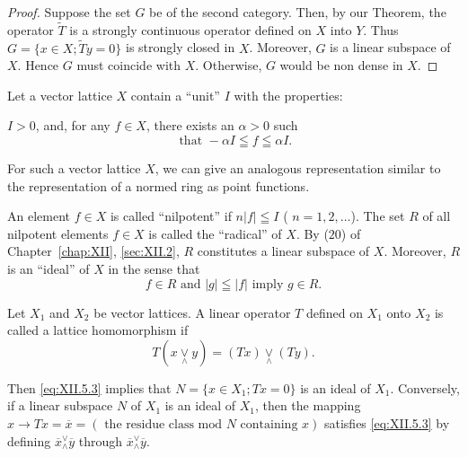 \begin{proof}
 Suppose the set $G$ be of the second category. Then, by our Theorem, the operator $\tilde{T}$ is a strongly continuous operator defined on $X$ into $Y$. Thus $G = \{x \in X; \tilde{T}y = 0\}$ is strongly closed in $X$. Moreover, $G$ is a linear subspace of $X$. Hence $G$ must coincide with $X$. Otherwise, $G$ would be non dense in $X$. 
\end{proof}


\label{sec:XII.5}

Let a vector lattice $X$ contain a ``unit'' $I$ with the properties: 

$I > 0$, and, for any $f \in X$, there exists an $\alpha > 0$ such 
\begin{equation}\label{eq:XII.5.1}
\text{ that } - \alpha I \leqq f \leqq \alpha I.
\end{equation}

For such a vector lattice $X$, we can give an analogous representation similar to the representation of a normed ring as point functions. 

An element $f \in X$ is called ``nilpotent'' if $n |f| \leqq I$ ( $n = 1, 2, \ldots$). The set $R$ of all nilpotent elements $f \in X$ is called the ``radical'' of $X$. By ($20$) of Chapter~\ref{chap:XII}, \ref{sec:XII.2}, $R$ constitutes a linear subspace of $X$. Moreover, $R$ is an ``ideal'' of $X$ in the sense that 
\begin{equation}\label{eq:XII.5.2}
f \in R \text{ and } | g | \leqq | f | \text{ imply } g \in R.
\end{equation}

\begin{lemmau} Let $X_{1}$ and $X_{2}$ be vector lattices. A linear operator $T$ defined on $X_{1}$ onto $X_{2}$ is called a lattice homomorphism if 
\begin{equation}\label{eq:XII.5.3}
T (x \underset {\wedge} {\vee} y) = (T x) \underset {\wedge} {\vee} (T y).
\end{equation}
\end{lemmau}

Then \eqref{eq:XII.5.3} implies that $N = \{x \in X_1; Tx = 0\}$ is an ideal of $X_1$. Conversely, if a linear subspace $N$ of $X_1$ is an ideal of $X_1$, then the mapping $x \to Tx = \overline{x} = (\text{ the residue class mod } N \text{ containing } x)$ satisfies \eqref{eq:XII.5.3} by defining $\overline{x}_{\wedge}^{\vee}\overline{y}$ through $\overline{x}_{\wedge}^{\vee}\overline{y}$. 

